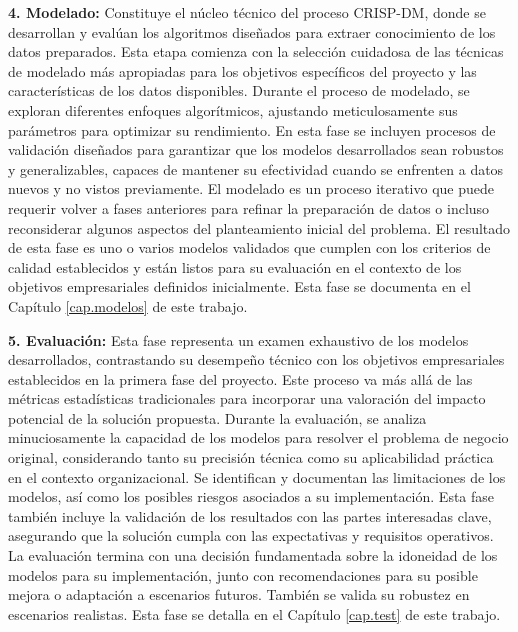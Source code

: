 \textbf{4. Modelado:} Constituye el núcleo técnico del proceso CRISP-DM, donde se desarrollan y evalúan los algoritmos diseñados para extraer conocimiento de los datos preparados. Esta etapa comienza con la selección cuidadosa de las técnicas de modelado más apropiadas para los objetivos específicos del proyecto y las características de los datos disponibles. Durante el proceso de modelado, se exploran diferentes enfoques algorítmicos, ajustando meticulosamente sus parámetros para optimizar su rendimiento. En esta fase se incluyen procesos de validación diseñados para garantizar que los modelos desarrollados sean robustos y generalizables, capaces de mantener su efectividad cuando se enfrenten a datos nuevos y no vistos previamente. El modelado es un proceso iterativo que puede requerir volver a fases anteriores para refinar la preparación de datos o incluso reconsiderar algunos aspectos del planteamiento inicial del problema. El resultado de esta fase es uno o varios modelos validados que cumplen con los criterios de calidad establecidos y están listos para su evaluación en el contexto de los objetivos empresariales definidos inicialmente. Esta fase se documenta en el Capítulo \ref{cap.modelos}  de este trabajo.

\textbf{5. Evaluación:} Esta fase representa un examen exhaustivo de los modelos desarrollados, contrastando su desempeño técnico con los objetivos empresariales establecidos en la primera fase del proyecto. Este proceso va más allá de las métricas estadísticas tradicionales para incorporar una valoración del impacto potencial de la solución propuesta. Durante la evaluación, se analiza minuciosamente la capacidad de los modelos para resolver el problema de negocio original, considerando tanto su precisión técnica como su aplicabilidad práctica en el contexto organizacional. Se identifican y documentan las limitaciones de los modelos, así como los posibles riesgos asociados a su implementación. Esta fase también incluye la validación de los resultados con las partes interesadas clave, asegurando que la solución cumpla con las expectativas y requisitos operativos. La evaluación termina con una decisión fundamentada sobre la idoneidad de los modelos para su implementación, junto con recomendaciones para su posible mejora o adaptación a escenarios futuros. También se valida su robustez en escenarios realistas. Esta fase se detalla en el Capítulo \ref{cap.test}  de este trabajo.

